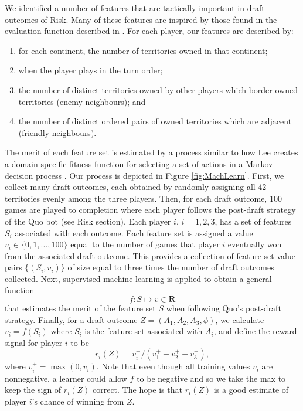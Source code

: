 \documentclass[letterpaper]{article}
\numberwithin{equation}{section}
\numberwithin{theorem}{section}
\numberwithin{lemma}{section}
\numberwithin{df}{section}
\begin{document}
We identified a number of features that are tactically important in draft outcomes of Risk.  Many of these features are inspired by those found in the evaluation function described in \cite{RiskBots}.  For each player, our features are described by:
\begin{enumerate}[i] \addtolength{\itemsep}{-0.5\baselineskip}
	\item for each continent, the number of territories owned in that continent;
	\item when the player plays in the turn order;
	\item the number of distinct territories owned by other players which border owned territories (enemy neighbours); and
	\item the number of distinct ordered pairs of owned territories which are adjacent (friendly neighbours).
\end{enumerate}
The merit of each feature set is estimated by a process similar to how Lee creates a domain-specific fitness function for selecting a set of actions in a Markov decision process \cite{GregLeeThesis}.  Our process is depicted in Figure \ref{fig:MachLearn}.  First, we collect many draft outcomes, each obtained by randomly assigning all 42 territories evenly among the three players.  Then, for each draft outcome, 100 games are played to completion where each player follows the post-draft strategy of the Quo bot (see Risk section).  Each player $i$, $i=1,2,3$, has a set of features $S_i$ associated with each outcome.  Each feature set is assigned a value $v_i \in \{0,1,...,100\}$ equal to the number of games that player $i$ eventually won from the associated draft outcome.  This provides a collection of feature set value pairs $\{(S_i, v_i)\}$ of size equal to three times the number of draft outcomes collected.  Next, supervised machine learning is applied to obtain a general function
\[ f: S \mapsto v \in \textbf{R} \] 
that estimates the merit of the feature set $S$ when following Quo's post-draft strategy.  Finally, for a draft outcome $Z = (A_1,A_2,A_3,\phi)$, we calculate $v_i = f(S_i)$ where $S_i$ is the feature set associated with $A_i$, and define the reward signal for player $i$ to be
\[ r_i(Z) = v_i^+ / \left(v_1^+ + v_2^+ + v_3^+\right), \]
where $v_i^+ = \max(0, v_i)$.  Note that even though all training values $v_i$ are nonnegative, a learner could allow $f$ to be negative and so we take the max to keep the sign of $r_i(Z)$ correct.  The hope is that $r_i(Z)$ is a good estimate of player $i$'s chance of winning from $Z$.
\end{document}
